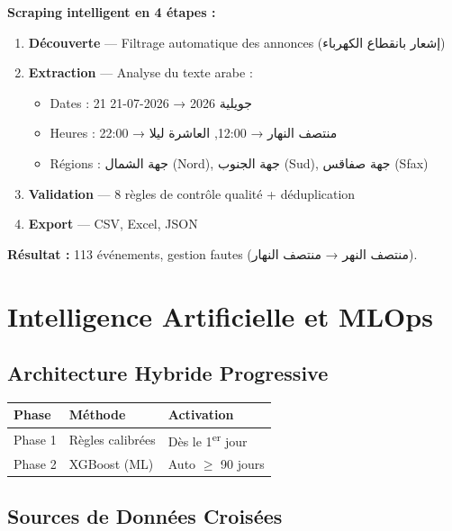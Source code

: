 \documentclass[10pt,a4paper]{article}
\begin{document}
\textbf{Scraping intelligent en 4 étapes :}
\begin{enumerate}
\item \textbf{Découverte} — Filtrage automatique des annonces (\textarabic{إشعار بانقطاع الكهرباء})
\item \textbf{Extraction} — Analyse du texte arabe : 
    \begin{itemize}
    \item Dates : \textarabic{21 جويلية 2026} → 2026-07-21
    \item Heures : \textarabic{منتصف النهار} → 12:00, \textarabic{العاشرة ليلا} → 22:00
    \item Régions : \textarabic{جهة الشمال} (Nord), \textarabic{جهة الجنوب} (Sud), \textarabic{جهة صفاقس} (Sfax)
    \end{itemize}
\item \textbf{Validation} — 8 règles de contrôle qualité + déduplication
\item \textbf{Export} — CSV, Excel, JSON
\end{enumerate}

\textbf{Résultat :} 113 événements, gestion fautes (\textarabic{منتصف النهر} → \textarabic{منتصف النهار}).

\section{Intelligence Artificielle et MLOps}
\vspace{-2pt}

\subsection*{Architecture Hybride Progressive}

\begin{center}
\small
\begin{tabular}{lll}
\toprule
\textbf{Phase} & \textbf{Méthode} & \textbf{Activation} \\
\midrule
Phase 1 & Règles calibrées & Dès le 1\textsuperscript{er} jour \\
Phase 2 & XGBoost (ML) & Auto $\geq$ 90 jours \\
\bottomrule
\end{tabular}
\end{center}

\subsection*{Sources de Données Croisées}
\end{document}
